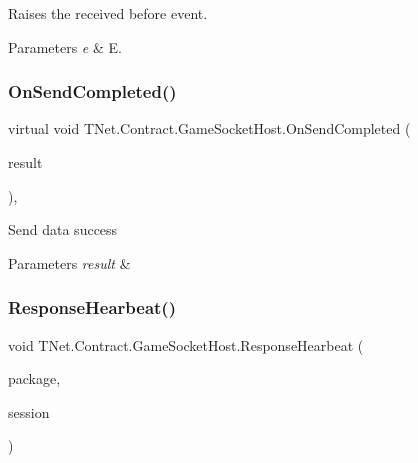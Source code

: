 Raises the received before event. 


\begin{DoxyParams}{Parameters}
{\em e} & E.\\
\hline
\end{DoxyParams}
\mbox{\label{class_t_net_1_1_contract_1_1_game_socket_host_a853b966ab69822360739da659d78906f}} 
\subsubsection{\texorpdfstring{On\+Send\+Completed()}{OnSendCompleted()}}
{\footnotesize\ttfamily virtual void T\+Net.\+Contract.\+Game\+Socket\+Host.\+On\+Send\+Completed (\begin{DoxyParamCaption}\item[{Socket\+Async\+Result}]{result }\end{DoxyParamCaption})\hspace{0.3cm}{\ttfamily [protected]}, {\ttfamily [virtual]}}



Send data success 


\begin{DoxyParams}{Parameters}
{\em result} & \\
\hline
\end{DoxyParams}
\mbox{\label{class_t_net_1_1_contract_1_1_game_socket_host_a93d2a165606829575afe771520a99b27}} 
\subsubsection{\texorpdfstring{Response\+Hearbeat()}{ResponseHearbeat()}}
{\footnotesize\ttfamily void T\+Net.\+Contract.\+Game\+Socket\+Host.\+Response\+Hearbeat (\begin{DoxyParamCaption}\item[{\mbox{\hyperlink{class_t_net_1_1_contract_1_1_request_package}{Request\+Package}}}]{package,  }\item[{\mbox{\hyperlink{class_t_net_1_1_contract_1_1_game_session}{Game\+Session}}}]{session }\end{DoxyParamCaption})\hspace{0.3cm}{\ttfamily [protected]}}



